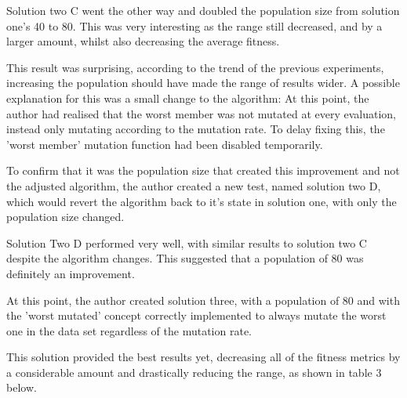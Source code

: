 \documentclass[sigconf]{acmart}
\begin{document}
Solution two C went the other way and doubled the population size from solution one's 40 to 80. This was very interesting as the range still decreased, and by a larger amount, whilst also decreasing the average fitness.

This result was surprising, according to the trend of the previous experiments, increasing the population should have made the range of results wider. A possible explanation for this was a small change to the algorithm: At this point, the author had realised that the worst member was not mutated at every evaluation, instead only mutating according to the mutation rate. To delay fixing this, the 'worst member' mutation function had been disabled temporarily.

To confirm that it was the population size that created this improvement and not the adjusted algorithm, the author created a new test, named solution two D, which would revert the algorithm back to it's state in solution one, with only the population size changed.

Solution Two D performed very well, with similar results to solution two C despite the algorithm changes. This suggested that a population of 80 was definitely an improvement.

At this point, the author created solution three, with a population of 80 and with the 'worst mutated' concept correctly implemented to always mutate the worst one in the data set regardless of the mutation rate. 

This solution provided the best results yet, decreasing all of the fitness metrics by a considerable amount and drastically reducing the range, as shown in table 3 below.
\end{document}
